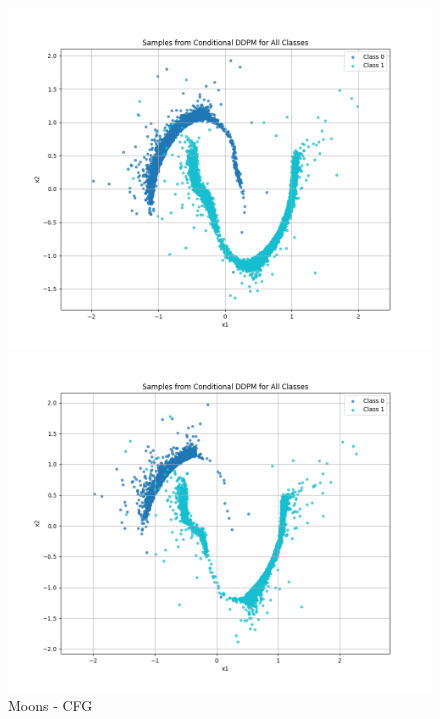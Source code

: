 \documentclass[a4paper,12pt]{article}
\begin{document}
\begin{figure}[H]
  \begin{minipage}{0.3\textwidth}
      \centering
      \includegraphics[width=\linewidth]{"images/Samples - CFG for cond_ddpm_2_50_0.0001_0.02_moons_2.0_sigmoid.png"}
  \end{minipage}
  \begin{minipage}{0.3\textwidth}
      \centering
      \includegraphics[width=\linewidth]{"images/Samples - CFG for cond_ddpm_2_50_0.0001_0.02_moons_4.0_sigmoid.png"}
  \end{minipage}

  \caption{Moons - CFG}
\end{figure}
\end{document}
